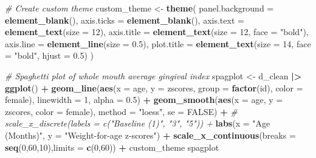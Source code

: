 \documentclass[
]{article}
\newenvironment{Shaded}{\begin{snugshade}}{\end{snugshade}}
\newcommand{\AttributeTok}[1]{\textcolor[rgb]{0.13,0.29,0.53}{#1}}
\newcommand{\CommentTok}[1]{\textcolor[rgb]{0.56,0.35,0.01}{\textit{#1}}}
\newcommand{\ConstantTok}[1]{\textcolor[rgb]{0.56,0.35,0.01}{#1}}
\newcommand{\DecValTok}[1]{\textcolor[rgb]{0.00,0.00,0.81}{#1}}
\newcommand{\FloatTok}[1]{\textcolor[rgb]{0.00,0.00,0.81}{#1}}
\newcommand{\FunctionTok}[1]{\textcolor[rgb]{0.13,0.29,0.53}{\textbf{#1}}}
\newcommand{\NormalTok}[1]{#1}
\newcommand{\OtherTok}[1]{\textcolor[rgb]{0.56,0.35,0.01}{#1}}
\newcommand{\SpecialCharTok}[1]{\textcolor[rgb]{0.81,0.36,0.00}{\textbf{#1}}}
\newcommand{\StringTok}[1]{\textcolor[rgb]{0.31,0.60,0.02}{#1}}
\begin{document}
\begin{Shaded}
\begin{Highlighting}[]
\CommentTok{\# Create custom theme}
\NormalTok{custom\_theme }\OtherTok{\textless{}{-}} \FunctionTok{theme}\NormalTok{(}
  \AttributeTok{panel.background =} \FunctionTok{element\_blank}\NormalTok{(),}
  \AttributeTok{axis.ticks =} \FunctionTok{element\_blank}\NormalTok{(),}
  \AttributeTok{axis.text =} \FunctionTok{element\_text}\NormalTok{(}\AttributeTok{size =} \DecValTok{12}\NormalTok{),}
  \AttributeTok{axis.title =} \FunctionTok{element\_text}\NormalTok{(}\AttributeTok{size =} \DecValTok{12}\NormalTok{, }\AttributeTok{face =} \StringTok{"bold"}\NormalTok{),}
  \AttributeTok{axis.line =} \FunctionTok{element\_line}\NormalTok{(}\AttributeTok{size =} \FloatTok{0.5}\NormalTok{),}
  \AttributeTok{plot.title =} \FunctionTok{element\_text}\NormalTok{(}\AttributeTok{size =} \DecValTok{14}\NormalTok{, }\AttributeTok{face =} \StringTok{"bold"}\NormalTok{, }\AttributeTok{hjust =} \FloatTok{0.5}\NormalTok{)}
\NormalTok{)}

\CommentTok{\# Spaghetti plot of whole mouth average gingival index}
\NormalTok{spagplot }\OtherTok{\textless{}{-}}\NormalTok{ d\_clean }\SpecialCharTok{|\textgreater{}}
  \FunctionTok{ggplot}\NormalTok{() }\SpecialCharTok{+}
  \FunctionTok{geom\_line}\NormalTok{(}\FunctionTok{aes}\NormalTok{(}\AttributeTok{x =}\NormalTok{ age, }\AttributeTok{y =}\NormalTok{ zscores, }\AttributeTok{group =} \FunctionTok{factor}\NormalTok{(id), }\AttributeTok{color =}\NormalTok{ female), }\AttributeTok{linewidth =} \DecValTok{1}\NormalTok{, }\AttributeTok{alpha =} \FloatTok{0.5}\NormalTok{) }\SpecialCharTok{+}
  \FunctionTok{geom\_smooth}\NormalTok{(}\FunctionTok{aes}\NormalTok{(}\AttributeTok{x =}\NormalTok{ age, }\AttributeTok{y =}\NormalTok{ zscores, }\AttributeTok{color =}\NormalTok{ female), }\AttributeTok{method =} \StringTok{"loess"}\NormalTok{, }\AttributeTok{se =} \ConstantTok{FALSE}\NormalTok{) }\SpecialCharTok{+}
  \CommentTok{\# scale\_x\_discrete(labels = c("Baseline (1)", "3", "5")) +}
  \FunctionTok{labs}\NormalTok{(}\AttributeTok{x =} \StringTok{"Age (Months)"}\NormalTok{, }\AttributeTok{y =} \StringTok{"Weight{-}for{-}age z{-}scores"}\NormalTok{) }\SpecialCharTok{+}
  \FunctionTok{scale\_x\_continuous}\NormalTok{(}\AttributeTok{breaks =} \FunctionTok{seq}\NormalTok{(}\DecValTok{0}\NormalTok{,}\DecValTok{60}\NormalTok{,}\DecValTok{10}\NormalTok{),}\AttributeTok{limits =} \FunctionTok{c}\NormalTok{(}\DecValTok{0}\NormalTok{,}\DecValTok{60}\NormalTok{)) }\SpecialCharTok{+}
\NormalTok{  custom\_theme}
\NormalTok{spagplot}
\end{Highlighting}
\end{Shaded}
\end{document}
